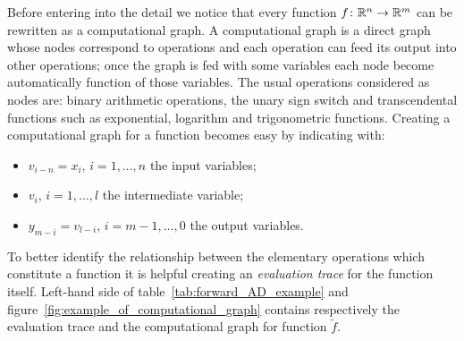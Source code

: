 \smallskip
Before entering into the detail we notice that every function $f \colon \mathbb{R}^n \to \mathbb{R}^m$ can be rewritten as a computational graph. A computational graph is a direct graph whose nodes correspond to operations and each operation can feed its output into other operations; once the graph is fed with some variables each node become automatically function of those variables. The usual operations considered as nodes are: binary arithmetic operations, the unary sign switch and transcendental functions such as exponential, logarithm and trigonometric functions.
Creating a computational graph for a function becomes easy by indicating with:
\begin{itemize}
	\item $v_{i-n}=x_i$, $i=1, \dots, n$ the input variables;
	\item $v_i$, $i=1, \dots, l$ the intermediate variable;
	\item $y_{m-i}=v_{l-i}$, $i=m-1, \dots, 0$ the output variables.
\end{itemize}
To better identify the relationship between the elementary operations which constitute a function it is helpful creating an \emph{evaluation trace} for the function itself.
Left-hand side of table~\ref{tab:forward_AD_example} and figure~\ref{fig:example_of_computational_graph} contains respectively the evaluation trace and the computational graph for function $\tilde{f}$.

